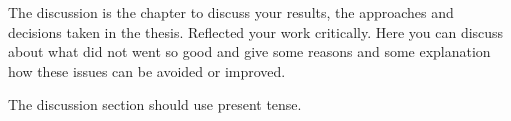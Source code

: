 The discussion is the chapter to discuss your results, the approaches and decisions taken in the thesis. Reflected your work critically. 
Here you can discuss about what did not went so good and give some reasons and some explanation how these issues can be avoided or improved. 

The discussion section should use present tense.